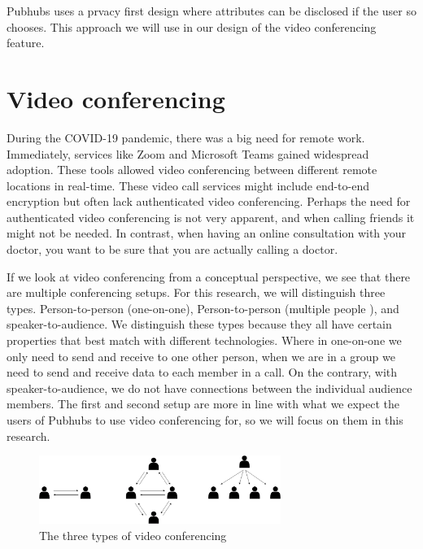 \documentclass{report}
\begin{document}
    Pubhubs uses a prvacy first design where attributes can be disclosed if the user so chooses. This approach we will
    use in our design of the video conferencing feature.


    \section{Video conferencing}
    During the COVID-19 pandemic, there was a big need for remote work. Immediately, services like Zoom \cite{Zoom}
    and Microsoft Teams  \cite{MSTeams}
    gained widespread adoption. These tools allowed video conferencing between different remote locations in real-time.
    These video call services might include end-to-end encryption but often lack authenticated video conferencing.
    Perhaps the need for authenticated video conferencing is not very apparent, and when calling friends it might not be
    needed. In contrast, when having an online consultation with your doctor, you want to be sure that you are actually
    calling a doctor.


    If we look at video conferencing from a conceptual perspective, we see that there are multiple conferencing setups.
    For this research, we will distinguish three types. Person-to-person (one-on-one), Person-to-person (multiple people
    ), and speaker-to-audience. We distinguish these types because they all have certain properties that best match with
    different technologies. Where in one-on-one we only need to send and receive to one other person, when we are in a
    group we need to send and receive data to each member in a call. On the contrary, with speaker-to-audience, we do
    not have connections between the individual audience members. The first and second setup are more in line with what
    we expect the users of Pubhubs to use video conferencing for, so we will focus on them in this research.

    \begin{figure}[!hbt]
        \centering
        \includegraphics[width=0.7\textwidth]{Research proposal/img/three types.drawio.png}
        \caption{The three types of video conferencing}
        \label{fig:enter-label}
    \end{figure}
\end{document}
